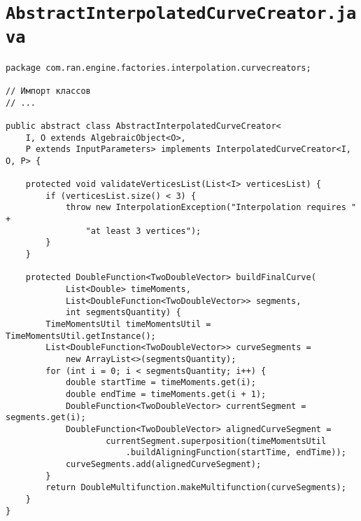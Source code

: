 \section*{\texttt{AbstractInterpolatedCurveCreator.java}}
\begin{verbatim}
package com.ran.engine.factories.interpolation.curvecreators;

// Импорт классов
// ...

public abstract class AbstractInterpolatedCurveCreator<
    I, O extends AlgebraicObject<O>,
    P extends InputParameters> implements InterpolatedCurveCreator<I, O, P> {

    protected void validateVerticesList(List<I> verticesList) {
        if (verticesList.size() < 3) {
            throw new InterpolationException("Interpolation requires " +
                "at least 3 vertices");
        }
    }

    protected DoubleFunction<TwoDoubleVector> buildFinalCurve(
            List<Double> timeMoments,
            List<DoubleFunction<TwoDoubleVector>> segments,
            int segmentsQuantity) {
        TimeMomentsUtil timeMomentsUtil = TimeMomentsUtil.getInstance();
        List<DoubleFunction<TwoDoubleVector>> curveSegments =
            new ArrayList<>(segmentsQuantity);
        for (int i = 0; i < segmentsQuantity; i++) {
            double startTime = timeMoments.get(i);
            double endTime = timeMoments.get(i + 1);
            DoubleFunction<TwoDoubleVector> currentSegment = segments.get(i);
            DoubleFunction<TwoDoubleVector> alignedCurveSegment =
                    currentSegment.superposition(timeMomentsUtil
                        .buildAligningFunction(startTime, endTime));
            curveSegments.add(alignedCurveSegment);
        }
        return DoubleMultifunction.makeMultifunction(curveSegments);
    }
}
\end{verbatim}
